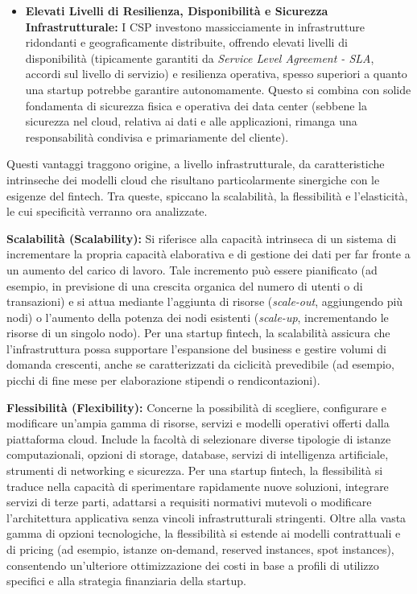 \begin{itemize}
\item \textbf{Elevati Livelli di Resilienza, Disponibilità e Sicurezza Infrastrutturale:} I CSP investono massicciamente in infrastrutture ridondanti e geograficamente distribuite, offrendo elevati livelli di disponibilità (tipicamente garantiti da \textit{Service Level Agreement - SLA}, accordi sul livello di servizio) e resilienza operativa, spesso superiori a quanto una startup potrebbe garantire autonomamente. Questo si combina con solide fondamenta di sicurezza fisica e operativa dei data center (sebbene la sicurezza nel cloud, relativa ai dati e alle applicazioni, rimanga una responsabilità condivisa e primariamente del cliente).
\end{itemize}

Questi vantaggi traggono origine, a livello infrastrutturale, da caratteristiche intrinseche dei modelli cloud che risultano particolarmente sinergiche con le esigenze del fintech. Tra queste, spiccano la scalabilità, la flessibilità e l'elasticità, le cui specificità verranno ora analizzate.

\textbf{Scalabilità (Scalability):} Si riferisce alla capacità intrinseca di un sistema di incrementare la propria capacità elaborativa e di gestione dei dati per far fronte a un aumento del carico di lavoro. Tale incremento può essere pianificato (ad esempio, in previsione di una crescita organica del numero di utenti o di transazioni) e si attua mediante l'aggiunta di risorse (\textit{scale-out}, aggiungendo più nodi) o l'aumento della potenza dei nodi esistenti (\textit{scale-up}, incrementando le risorse di un singolo nodo). Per una startup fintech, la scalabilità assicura che l'infrastruttura possa supportare l'espansione del business e gestire volumi di domanda crescenti, anche se caratterizzati da ciclicità prevedibile (ad esempio, picchi di fine mese per elaborazione stipendi o rendicontazioni).

\textbf{Flessibilità (Flexibility):} Concerne la possibilità di scegliere, configurare e modificare un'ampia gamma di risorse, servizi e modelli operativi offerti dalla piattaforma cloud. Include la facoltà di selezionare diverse tipologie di istanze computazionali, opzioni di storage, database, servizi di intelligenza artificiale, strumenti di networking e sicurezza. Per una startup fintech, la flessibilità si traduce nella capacità di sperimentare rapidamente nuove soluzioni, integrare servizi di terze parti, adattarsi a requisiti normativi mutevoli o modificare l'architettura applicativa senza vincoli infrastrutturali stringenti. Oltre alla vasta gamma di opzioni tecnologiche, la flessibilità si estende ai modelli contrattuali e di pricing (ad esempio, istanze on-demand, reserved instances, spot instances), consentendo un'ulteriore ottimizzazione dei costi in base a profili di utilizzo specifici e alla strategia finanziaria della startup.

